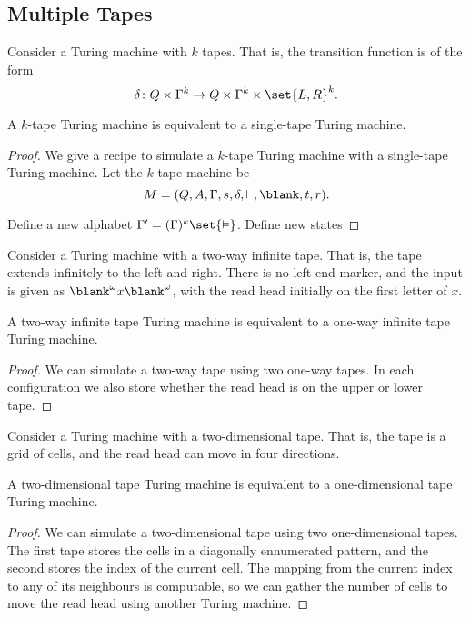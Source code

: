 \subsection{Multiple Tapes} \label{sec:tm:equiv:multiple_tapes}
Consider a Turing machine with $k$ tapes.
That is, the transition function is of the form
\[
    \delta\colon Q \times \Gamma^k \to Q \times \Gamma^k \times \set{L, R}^k.
\]
\begin{theorem*} \label{thm:tm:k_tape}
    A $k$-tape Turing machine is equivalent to a single-tape Turing machine.
\end{theorem*}
\begin{proof}
    We give a recipe to simulate a $k$-tape Turing machine with a
    single-tape Turing machine.
    Let the $k$-tape machine be \[
        M = (Q, A, \Gamma, s, \delta, \vdash, \blank, t, r).
    \]

    Define a new alphabet $\Gamma' = (\Gamma)^k \set{\vDash}$.
    Define new states 
\end{proof}

Consider a Turing machine with a two-way infinite tape.
That is, the tape extends infinitely to the left and right.
There is no left-end marker, and the input is given as
$\blank^\omega x \blank^\omega$, with the read head initially on the
first letter of $x$.
\begin{theorem*} \label{thm:tm:two_way}
    A two-way infinite tape Turing machine is equivalent to a one-way
    infinite tape Turing machine.
\end{theorem*}
\begin{proof}
    We can simulate a two-way tape using two one-way tapes.
    In each configuration we also store whether the read head is on the
    upper or lower tape.
\end{proof}

Consider a Turing machine with a two-dimensional tape.
That is, the tape is a grid of cells, and the read head can move in
four directions.

\begin{theorem*} \label{thm:tm:2d}
    A two-dimensional tape Turing machine is equivalent to a one-dimensional
    tape Turing machine.
\end{theorem*}
\begin{proof}
    We can simulate a two-dimensional tape using two one-dimensional tapes.
    The first tape stores the cells in a diagonally ennumerated pattern,
    and the second stores the index of the current cell.
    The mapping from the current index to any of its neighbours is
    computable, so we can gather the number of cells to move the read head
    using another Turing machine.
\end{proof}

